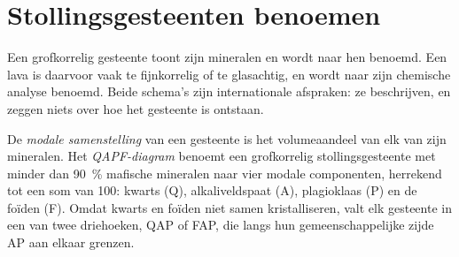 \section{Stollingsgesteenten benoemen}\label{sec:b2:magmatic-series:naming}

Een grofkorrelig gesteente toont zijn mineralen en wordt naar hen benoemd. Een lava is daarvoor vaak te
fijnkorrelig of te glasachtig, en wordt naar zijn chemische analyse benoemd. Beide
schema's zijn internationale afspraken: ze beschrijven, en zeggen niets over hoe
het gesteente is ontstaan.

\begin{definition}\label{def:b2:magmatic-series:qapf}
De \emph{modale samenstelling} van een gesteente is het
volumeaandeel van elk van zijn mineralen. Het \emph{QAPF-diagram} benoemt een
grofkorrelig stollingsgesteente met minder dan \qty{90}{\percent} mafische mineralen naar
vier modale componenten, herrekend tot een som van 100: kwarts (Q), alkaliveldspaat
(A), plagioklaas (P) en de foïden (F). Omdat kwarts en foïden niet
samen kristalliseren, valt elk gesteente in een van twee driehoeken, QAP of FAP, die
langs hun gemeenschappelijke zijde AP aan elkaar grenzen.
\end{definition}

